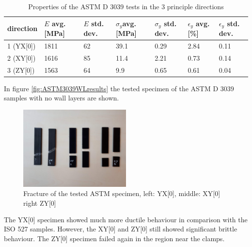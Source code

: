 \begin{table}
\centering
\caption{Properties of the ASTM D 3039 tests in the 3 principle directions}
          \label{tab:ASTM3039results}
\begin{tabular}{ p{1.5cm}p{1cm}p{1cm}p{1cm}p{1cm}p{1cm}p{1cm}  }
\hline
direction & $E$ avg. [MPa] & $E$ std. dev. & $\sigma_y$avg. [MPa] & $\sigma_y$ std. dev. & $\epsilon_y$ avg. [\%] & $\epsilon_y$   std. dev. \\
 \hline
1 (YX[0]) & 1811 & 62 & 39.1 & 0.29 & 2.84 & 0.11 \\
2 (XY[0]) & 1616 & 85 & 11.4 & 2.21 & 0.73 & 0.14 \\
3 (ZY[0]) & 1563 & 64 & 9.9 & 0.65 & 0.61 & 0.04\\
 \hline
\end{tabular}
\end{table}

In figure \ref{fig:ASTM3039WLresults} the tested specimen of the ASTM D 3039 samples with no wall layers are shown.
\begin{figure}[H]
    \centering
    \includegraphics[width=0.50\textwidth]{chapter_5_Experimentaltesting/figures/ImageASTM.jpg}
    \caption{Fracture of the tested ASTM specimen, left: YX[0], middle: XY[0] right ZY[0]}
    \label{fig:ASTM3039specimen}
\end{figure}
The YX[0] specimen showed much more ductile behaviour in comparison with the ISO 527 samples. However, the XY[0] and ZY[0] still showed significant brittle behaviour. The ZY[0] specimen failed again in the region near the clamps.

